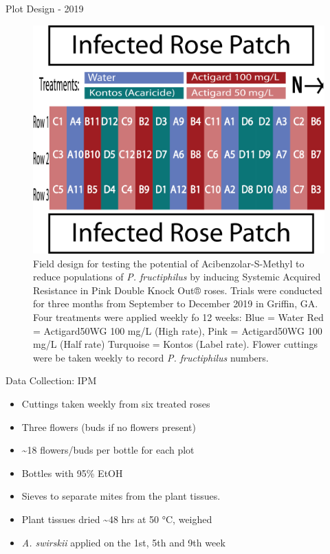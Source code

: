 \documentclass[
  ignorenonframetext,
]{beamer}
\providecommand{\tightlist}{%
  \setlength{\itemsep}{0pt}\setlength{\parskip}{0pt}}
\begin{document}
\begin{frame}
\begin{block}{Plot Design - 2019}
\protect\hypertarget{plot-design---2019}{}
\begin{figure}
\includegraphics[width=0.8\linewidth]{figure/rrv_asm_plot_2019_griffin} \caption{Field design for testing the potential of Acibenzolar-S-Methyl to reduce populations of \textit{P. fructiphilus} by inducing Systemic Acquired Resistance in Pink Double Knock Out® roses. Trials were conducted for three months from September to December 2019 in Griffin, GA. Four treatments were applied weekly fo 12 weeks: Blue = Water Red = Actigard50WG 100 \si{\milli\gram}/L (High rate),  Pink = Actigard50WG 100 \si{\milli\gram}/L (Half rate) Turquoise = Kontos (Label rate). Flower cuttings were be taken weekly to record \textit{P. fructiphilus} numbers.}\label{fig:unnamed-chunk-2}
\end{figure}
\end{block}

\begin{block}{Data Collection: IPM}
\protect\hypertarget{data-collection-ipm}{}
\begin{itemize}
\tightlist
\item
  Cuttings taken weekly from six treated roses
\item
  Three flowers (buds if no flowers present)
\item
  \textasciitilde18 flowers/buds per bottle for each plot
\item
  Bottles with 95\% EtOH
\item
  Sieves to separate mites from the plant tissues.
\item
  Plant tissues dried \textasciitilde48 hrs at 50 °C, weighed
\item
  \emph{A. swirskii} applied on the 1st, 5th and 9th week
\end{itemize}
\end{block}


\end{frame}
\end{document}
